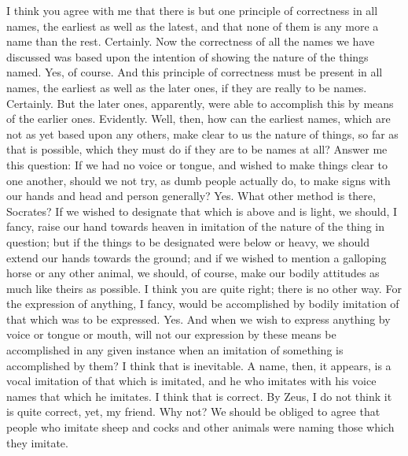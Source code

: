 {{{{{\socratesspeaks
I think you agree with me that there is but one principle of correctness in all names, the earliest as well as the latest, and that none of them is any more a name than the rest.
\hermogenesspeaks
Certainly. 
\socratesspeaks
Now the correctness of all the names we have discussed was based upon the intention of showing the nature of the things named.
\hermogenesspeaks
Yes, of course.
\socratesspeaks
And this principle of correctness must be present in all names, the earliest as well as the later ones, if they are really to be names.
\hermogenesspeaks
Certainly.
\socratesspeaks
But the later ones, apparently, were able to accomplish this by means of the earlier ones.
\hermogenesspeaks
Evidently.
\socratesspeaks
Well, then, how can the earliest names, which are not as yet based upon any others, make clear to us the nature of things, so far as that is possible,  which they must do if they are to be names at all? Answer me this question: If we had no voice or tongue, and wished to make things clear to one another, should we not try, as dumb people actually do, to make signs with our hands and head and person generally?
\hermogenesspeaks
Yes. What other method is there, Socrates? 
\socratesspeaks
If we wished to designate that which is above and is light, we should, I fancy, raise our hand towards heaven in imitation of the nature of the thing in question; but if the things to be designated were below or heavy, we should extend our hands towards the ground; and if we wished to mention a galloping horse or any other animal, we should, of course, make our bodily attitudes as much like theirs as possible.
\hermogenesspeaks
I think you are quite right; there is no other way.
\socratesspeaks
For the expression of anything, I fancy,  would be accomplished by bodily imitation of that which was to be expressed.
\hermogenesspeaks
Yes.
\socratesspeaks
And when we wish to express anything by voice or tongue or mouth, will not our expression by these means be accomplished in any given instance when an imitation of something is accomplished by them?
\hermogenesspeaks
I think that is inevitable.
\socratesspeaks
A name, then, it appears, is a vocal imitation of that which is imitated, and he who imitates with his voice names that which he imitates.
\hermogenesspeaks
I think that is correct. 
\socratesspeaks
By Zeus, I do not think it is quite correct, yet, my friend.
\hermogenesspeaks
Why not?
\socratesspeaks
We should be obliged to agree that people who imitate sheep and cocks and other animals were naming those which they imitate.
}}}}}

